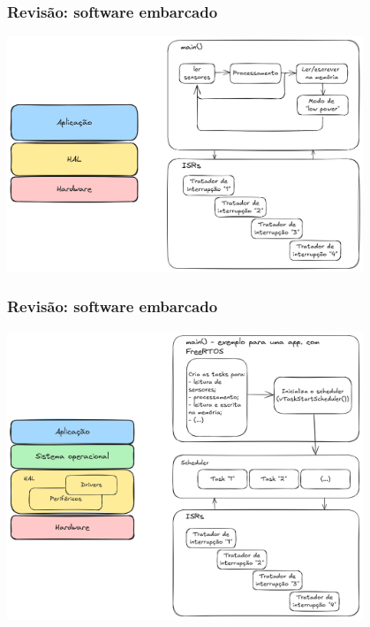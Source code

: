 \documentclass{beamer}
\begin{document}
\begin{frame}[fragile]
    \frametitle{Revisão: software embarcado}

    \begin{center}
        \includegraphics[width=0.8\textwidth]{../figures/bare_metal_software.png}
    \end{center}
\end{frame}

\begin{frame}[fragile]
    \frametitle{Revisão: software embarcado}

    \begin{center}
        \includegraphics[width=0.8\textwidth]{../figures/os_based_software.png}
    \end{center}
\end{frame}

\end{document}
